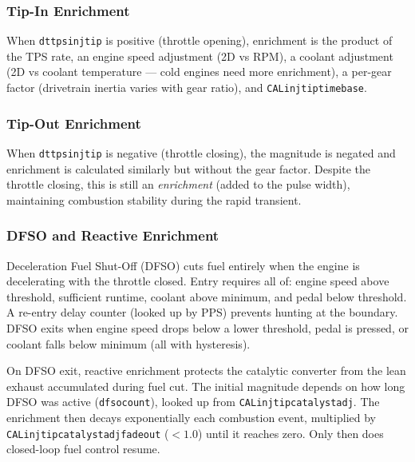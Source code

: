 \documentclass[a4paper,11pt]{article}
\renewcommand{\_}{\oldunderscore\allowbreak}
\begin{document}
\subsubsection*{Tip-In Enrichment}

When \texttt{dt\_tps\_injtip} is positive (throttle opening), enrichment is
the product of the TPS rate, an engine speed adjustment (2D vs RPM), a coolant
adjustment (2D vs coolant temperature --- cold engines need more enrichment),
a per-gear factor (drivetrain inertia varies with gear ratio), and
\texttt{CAL\_injtip\_time\_base}.

\subsubsection*{Tip-Out Enrichment}

When \texttt{dt\_tps\_injtip} is negative (throttle closing), the magnitude is
negated and enrichment is calculated similarly but without the gear factor.
Despite the throttle closing, this is still an \emph{enrichment} (added to the
pulse width), maintaining combustion stability during the rapid transient.

\subsubsection*{DFSO and Reactive Enrichment}

Deceleration Fuel Shut-Off (DFSO) cuts fuel entirely when the engine is
decelerating with the throttle closed. Entry requires all of: engine speed
above threshold, sufficient runtime, coolant above minimum, and pedal below
threshold. A re-entry delay counter (looked up by PPS) prevents hunting at the
boundary. DFSO exits when engine speed drops below a lower threshold, pedal
is pressed, or coolant falls below minimum (all with hysteresis).

On DFSO exit, reactive enrichment protects the catalytic converter from the
lean exhaust accumulated during fuel cut.
The initial magnitude depends on how long DFSO was active
(\texttt{dfso\_count}), looked up from \texttt{CAL\_injtip\_catalyst\_adj}.
The enrichment then decays exponentially each combustion event, multiplied by
\texttt{CAL\_injtip\_catalyst\_adj\_fadeout} ($<1.0$) until it reaches zero.
Only then does closed-loop fuel control resume.
\end{document}
